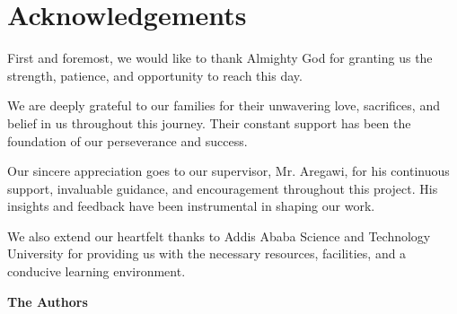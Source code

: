 \chapter*{Acknowledgements}

First and foremost, we would like to thank Almighty God for granting us the strength, patience, and opportunity to reach this day.

We are deeply grateful to our families for their unwavering love, sacrifices, and belief in us throughout this journey. Their constant support has been the foundation of our perseverance and success.

Our sincere appreciation goes to our supervisor, Mr. Aregawi, for his continuous support, invaluable guidance, and encouragement throughout this project. His insights and feedback have been instrumental in shaping our work.

We also extend our heartfelt thanks to Addis Ababa Science and Technology University for providing us with the necessary resources, facilities, and a conducive learning environment.

\vspace{1cm}
\hfill \textbf{The Authors}
